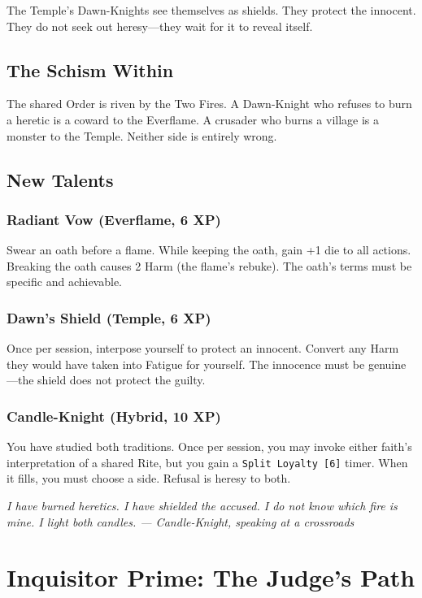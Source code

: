 \documentclass{book}
\newcommand{\citation}[1]{\textcolor{marginalia}{\small\textit{#1}}}
\begin{document}
The Temple's Dawn-Knights see themselves as shields. They protect the innocent. They do not seek out heresy---they wait for it to reveal itself.

\section{The Schism Within}

The shared Order is riven by the Two Fires. A Dawn-Knight who refuses to burn a heretic is a coward to the Everflame. A crusader who burns a village is a monster to the Temple. Neither side is entirely wrong.

\section{New Talents}

\subsection{Radiant Vow (Everflame, 6 XP)}

Swear an oath before a flame. While keeping the oath, gain +1 die to all actions. Breaking the oath causes 2 Harm (the flame's rebuke). The oath's terms must be specific and achievable.

\subsection{Dawn's Shield (Temple, 6 XP)}

Once per session, interpose yourself to protect an innocent. Convert any Harm they would have taken into Fatigue for yourself. The innocence must be genuine---the shield does not protect the guilty.

\subsection{Candle-Knight (Hybrid, 10 XP)}

You have studied both traditions. Once per session, you may invoke either faith's interpretation of a shared Rite, but you gain a \texttt{Split Loyalty [6]} timer. When it fills, you must choose a side. Refusal is heresy to both.

\citation{I have burned heretics. I have shielded the accused. I do not know which fire is mine. I light both candles. --- Candle-Knight, speaking at a crossroads}

\chapter{Inquisitor Prime: The Judge's Path}
\end{document}
